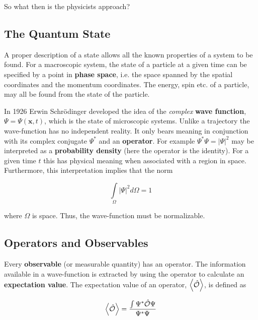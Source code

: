 So what then is the physicists approach?



\subsection{The Quantum State}

A proper description of a state allows all the known properties of
a system to be found. For a macroscopic system, the state of a
particle at a given time can be specified by a point in 
{\bf phase space}, i.e. the space spanned by the spatial coordinates
and the momentum coordinates. The energy, spin etc. of a particle, may 
all be found from the state of the particle.

In 1926 Erwin Schr\"odinger developed the idea of the \emph{complex}
{\bf wave function}, $\Psi = \Psi (\mathbf{x},t)$,
which is the state of microscopic systems. Unlike a trajectory the
wave-function has no independent reality. It only bears meaning in
conjunction with its complex conjugate $\Psi^*$ and an {\bf
  operator}. For example $\Psi^* \Psi = |\Psi|^2$ 
may be interpreted as a {\bf probability density} (here the operator
is the identity). For a given time
$t$ this has physical meaning when associated with a region in
space. Furthermore, this interpretation implies that the norm

\begin{equation*}
  \int\limits_{\Omega} |\Psi|^2 d\Omega = 1
\end{equation*}

where $\Omega$ is space. Thus, the wave-function must be
normalizable. 



\subsection{Operators and Observables}

Every {\bf observable} (or measurable quantity) has an operator. The
information available in a wave-function is extracted by using the
operator to calculate an {\bf expectation value}. The expectation
value of an operator, $\left< \hat{{\cal O}} \right>$, is defined as

\begin{equation*}
  \left< \hat{{\cal O}} \right> 
  = \frac {\int \Psi^* \hat{{\cal O}} \Psi}  {\Psi^* \Psi}
\end{equation*}

